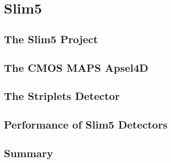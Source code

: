 \chapter{Slim5}
\label{chap:Slim5}

\section{The Slim5 Project}

\section{The CMOS MAPS Apsel4D}

\section{The Striplets Detector}

\section{Performance of Slim5 Detectors}

\section{Summary}